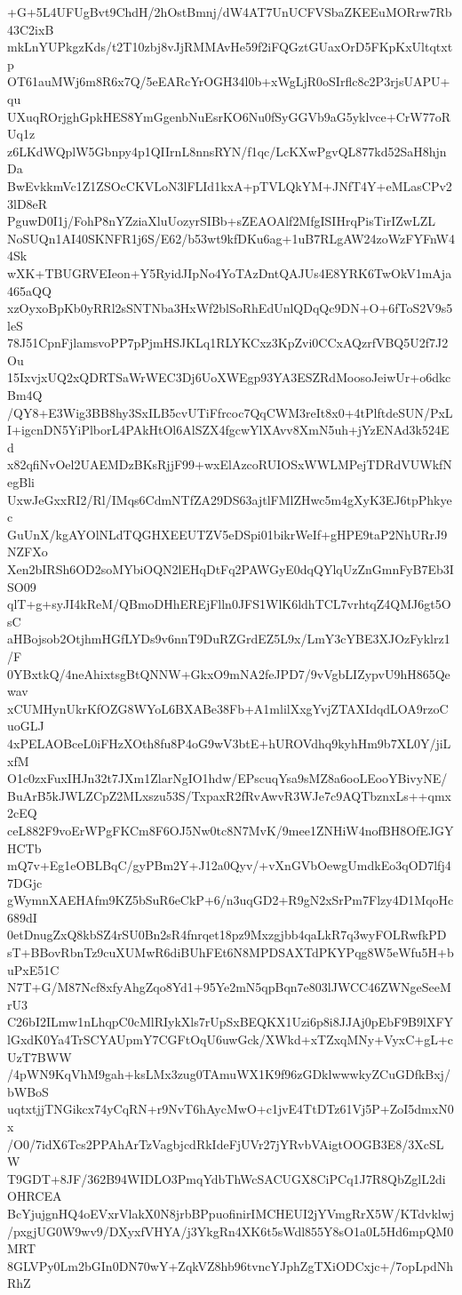 +G+5L4UFUgBvt9ChdH/2hOstBmnj/dW4AT7UnUCFVSbaZKEEuMORrw7Rb43C2ixB
mkLnYUPkgzKds/t2T10zbj8vJjRMMAvHe59f2iFQGztGUaxOrD5FKpKxUltqtxtp
OT61auMWj6m8R6x7Q/5eEARcYrOGH34l0b+xWgLjR0oSIrflc8c2P3rjsUAPU+qu
UXuqROrjghGpkHES8YmGgenbNuEsrKO6Nu0fSyGGVb9aG5yklvce+CrW77oRUq1z
z6LKdWQplW5Gbnpy4p1QIIrnL8nnsRYN/f1qc/LcKXwPgvQL877kd52SaH8hjnDa
BwEvkkmVc1Z1ZSOcCKVLoN3lFLId1kxA+pTVLQkYM+JNfT4Y+eMLasCPv23lD8eR
PguwD0I1j/FohP8nYZziaXluUozyrSIBb+sZEAOAlf2MfgISIHrqPisTirIZwLZL
NoSUQn1AI40SKNFR1j6S/E62/b53wt9kfDKu6ag+1uB7RLgAW24zoWzFYFnW44Sk
wXK+TBUGRVEIeon+Y5RyidJIpNo4YoTAzDntQAJUs4E8YRK6TwOkV1mAja465aQQ
xzOyxoBpKb0yRRl2sSNTNba3HxWf2blSoRhEdUnlQDqQc9DN+O+6fToS2V9s5leS
78J51CpnFjlamsvoPP7pPjmHSJKLq1RLYKCxz3KpZvi0CCxAQzrfVBQ5U2f7J2Ou
15IxvjxUQ2xQDRTSaWrWEC3Dj6UoXWEgp93YA3ESZRdMoosoJeiwUr+o6dkcBm4Q
/QY8+E3Wig3BB8hy3SxILB5cvUTiFfrcoc7QqCWM3reIt8x0+4tPlftdeSUN/PxL
I+igcnDN5YiPlborL4PAkHtOl6AlSZX4fgcwYlXAvv8XmN5uh+jYzENAd3k524Ed
x82qfiNvOel2UAEMDzBKsRjjF99+wxElAzcoRUIOSxWWLMPejTDRdVUWkfNegBli
UxwJeGxxRI2/Rl/IMqs6CdmNTfZA29DS63ajtlFMlZHwc5m4gXyK3EJ6tpPhkyec
GuUnX/kgAYOlNLdTQGHXEEUTZV5eDSpi01bikrWeIf+gHPE9taP2NhURrJ9NZFXo
Xen2bIRSh6OD2soMYbiOQN2lEHqDtFq2PAWGyE0dqQYlqUzZnGmnFyB7Eb3ISO09
qlT+g+syJI4kReM/QBmoDHhEREjFlln0JFS1WlK6ldhTCL7vrhtqZ4QMJ6gt5OsC
aHBojsob2OtjhmHGfLYDs9v6nnT9DuRZGrdEZ5L9x/LmY3cYBE3XJOzFyklrz1/F
0YBxtkQ/4neAhixtsgBtQNNW+GkxO9mNA2feJPD7/9vVgbLIZypvU9hH865Qewav
xCUMHynUkrKfOZG8WYoL6BXABe38Fb+A1mlilXxgYvjZTAXIdqdLOA9rzoCuoGLJ
4xPELAOBceL0iFHzXOth8fu8P4oG9wV3btE+hUROVdhq9kyhHm9b7XL0Y/jiLxfM
O1c0zxFuxIHJn32t7JXm1ZlarNgIO1hdw/EPscuqYsa9sMZ8a6ooLEooYBivyNE/
BuArB5kJWLZCpZ2MLxszu53S/TxpaxR2fRvAwvR3WJe7c9AQTbznxLs++qmx2cEQ
ceL882F9voErWPgFKCm8F6OJ5Nw0tc8N7MvK/9mee1ZNHiW4nofBH8OfEJGYHCTb
mQ7v+Eg1eOBLBqC/gyPBm2Y+J12a0Qyv/+vXnGVbOewgUmdkEo3qOD7lfj47DGjc
gWymnXAEHAfm9KZ5bSuR6eCkP+6/n3uqGD2+R9gN2xSrPm7Flzy4D1MqoHc689dI
0etDnugZxQ8kbSZ4rSU0Bn2sR4fnrqet18pz9Mxzgjbb4qaLkR7q3wyFOLRwfkPD
sT+BBovRbnTz9cuXUMwR6diBUhFEt6N8MPDSAXTdPKYPqg8W5eWfu5H+buPxE51C
N7T+G/M87Ncf8xfyAhgZqo8Yd1+95Ye2mN5qpBqn7e803lJWCC46ZWNgeSeeMrU3
C26bI2ILmw1nLhqpC0cMlRIykXls7rUpSxBEQKX1Uzi6p8i8JJAj0pEbF9B9lXFY
lGxdK0Ya4TrSCYAUpmY7CGFtOqU6uwGck/XWkd+xTZxqMNy+VyxC+gL+cUzT7BWW
/4pWN9KqVhM9gah+ksLMx3zug0TAmuWX1K9f96zGDklwwwkyZCuGDfkBxj/bWBoS
uqtxtjjTNGikcx74yCqRN+r9NvT6hAycMwO+c1jvE4TtDTz61Vj5P+ZoI5dmxN0x
/O0/7idX6Tcs2PPAhArTzVagbjcdRkIdeFjUVr27jYRvbVAigtOOGB3E8/3XcSLW
T9GDT+8JF/362B94WIDLO3PmqYdbThWcSACUGX8CiPCq1J7R8QbZglL2diOHRCEA
BcYjujgnHQ4oEVxrVlakX0N8jrbBPpuofinirIMCHEUI2jYVmgRrX5W/KTdvklwj
/pxgjUG0W9wv9/DXyxfVHYA/j3YkgRn4XK6t5sWdl855Y8sO1a0L5Hd6mpQM0MRT
8GLVPy0Lm2bGIn0DN70wY+ZqkVZ8hb96tvncYJphZgTXiODCxjc+/7opLpdNhRhZ
